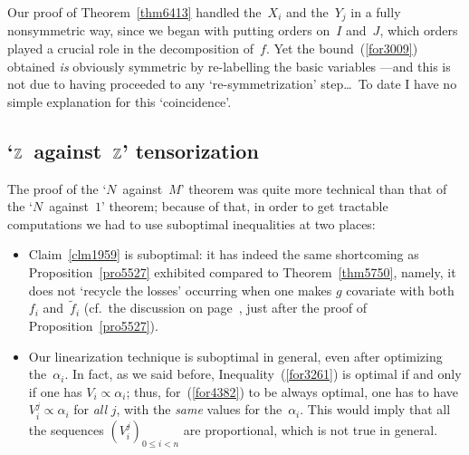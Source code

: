 \begin{Rmk}
Our proof of Theorem~\ref{thm6413}
handled the~$X_i$ and the~$Y_j$ in a fully nonsymmetric way,
since we began with putting orders on~$I$ and~$J$,
which orders played a crucial role in the decomposition of~$f$.
%
Yet the bound~(\ref{for3009}) obtained \emph{is} obviously symmetric
by re-labelling the basic variables%
—and this is not due to having proceeded to any `re-symmetrization' step\dots\ 
To date I have no simple explanation for this `coincidence'.
\end{Rmk}


\subsection{`\texorpdfstring{$\mathbb{Z}$}{Z}~against~\texorpdfstring{$\mathbb{Z}$}{Z}' tensorization}

The proof of the `$N$~against~$M$' theorem was quite more technical than
that of the `$N$~against~$1$' theorem;
because of that, in order to get tractable computations
we had to use suboptimal inequalities at two places:
%
\begin{itemize}
\item Claim~\ref{clm1959} is suboptimal: it has indeed the same shortcoming
as Proposition~\ref{pro5527} exhibited compared to Theorem~\ref{thm5750},
namely, it does not `recycle the losses' occurring
when one makes $g$ covariate with both~$f_i$ and~$\tilde{f}_i$
(cf.\ the discussion on page~\pageref{lbl91},
just after the proof of Proposition~\ref{pro5527}).
%
\item Our linearization technique is suboptimal in general,
even after optimizing the~$\alpha_i$.
In fact, as we said before, Inequality~(\ref{for3261}) is optimal
if and only if one has $V_i \propto \alpha_i$;
thus, for~(\ref{for4382}) to be always optimal,
one has to have $V^j_i \propto \alpha_i$
for \emph{all} $j$, with the \emph{same} values for the~$\alpha_i$.
This would imply that all the sequences $(V_i^j)_{0\leq i<n}$
are proportional, which is not true in general.
\end{itemize}

